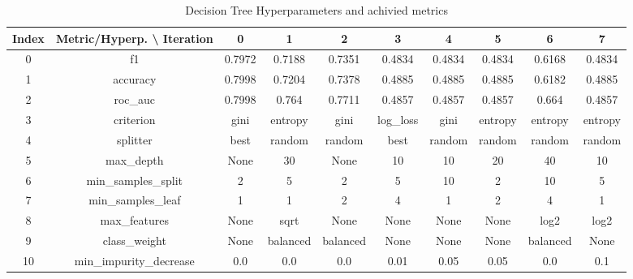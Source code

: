 \documentclass{article}%
\begin{document}
\begin{table}[h!]%
\caption{Decision Tree Hyperparameters and achivied metrics}%
\vspace{0.2cm}%
\centering%
\begin{tabular}{|c||c||c||c||c||c||c||c||c||c|}%
\hline%
Index&Metric/Hyperp. \textbackslash{} Iteration&0&1&2&3&4&5&6&7\\%
\hline%
0&f1&0.7972&0.7188&0.7351&0.4834&0.4834&0.4834&0.6168&0.4834\\%
1&accuracy&0.7998&0.7204&0.7378&0.4885&0.4885&0.4885&0.6182&0.4885\\%
2&roc\_auc&0.7998&0.764&0.7711&0.4857&0.4857&0.4857&0.664&0.4857\\%
3&criterion&gini&entropy&gini&log\_loss&gini&entropy&entropy&entropy\\%
4&splitter&best&random&random&best&random&random&random&random\\%
5&max\_depth&None&30&None&10&10&20&40&10\\%
6&min\_samples\_split&2&5&2&5&10&2&10&5\\%
7&min\_samples\_leaf&1&1&2&4&1&2&4&1\\%
8&max\_features&None&sqrt&None&None&None&None&log2&log2\\%
9&class\_weight&None&balanced&balanced&None&None&None&balanced&None\\%
10&min\_impurity\_decrease&0.0&0.0&0.0&0.01&0.05&0.05&0.0&0.1\\%
\hline%
\end{tabular}%
\end{table}

%
\end{document}
